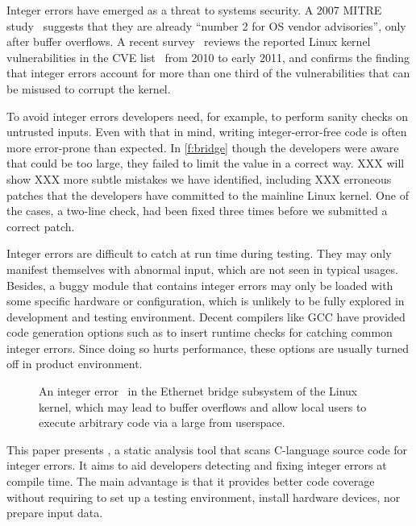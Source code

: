 Integer errors have emerged as a threat to systems security.  A
2007 MITRE study~\cite{christey:vuln} suggests that they are already
``number 2 for OS vendor advisories'', only after buffer overflows.
A recent survey~\cite{chen:kbugs} reviews the reported Linux kernel
vulnerabilities in the CVE list~\cite{cve} from 2010 to early 2011,
and confirms the finding that integer errors account for more than
one third of the vulnerabilities that can be misused to corrupt the
kernel.

To avoid integer errors developers need, for example, to perform
sanity checks on untrusted inputs.  Even with that in mind, writing
integer-error-free code is often more error-prone than expected.
In \autoref{f:bridge} though the developers were aware that 
could be too large, they failed to limit the value in a correct
way.  XXX will show XXX more subtle mistakes we have identified,
including XXX erroneous patches that the developers have committed
to the mainline Linux kernel.  One of the cases, a two-line check,
had been fixed three times before we submitted a correct patch.

Integer errors are difficult to catch at run time during testing.
They may only manifest themselves with abnormal input, which are
not seen in typical usages.  Besides, a buggy module that contains
integer errors may only be loaded with some specific hardware or
configuration, which is unlikely to be fully explored in development
and testing environment.  Decent compilers like GCC have provided
code generation options such as  to insert runtime
checks for catching common integer errors.  Since doing so hurts
performance, these options are usually turned off in product
environment.
\fi

\begin{figure}[t]
\centering

\vspace{-1em}
\caption{An integer error~\cite[CVE-2006-5751]{cve} in the Ethernet
bridge subsystem of the Linux kernel, which may lead to buffer
overflows and allow local users to execute arbitrary code via a
large  from userspace.}
\label{f:bridge}
\end{figure}

This paper presents \sys, a static analysis tool that scans C-language
source code for integer errors.  It aims to aid developers detecting
and fixing integer errors at compile time.  The main advantage is
that it provides better code coverage without requiring to set up
a testing environment, install hardware devices, nor prepare input
data.

